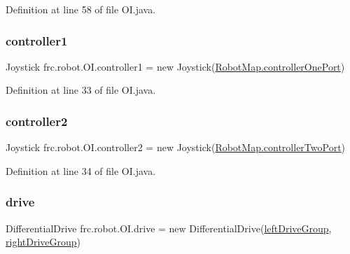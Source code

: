 Definition at line 58 of file O\+I.\+java.

\mbox{\label{classfrc_1_1robot_1_1_o_i_a06db411c1eebb80d10f685c57954bac9}} 
\subsubsection{\texorpdfstring{controller1}{controller1}}
{\footnotesize\ttfamily Joystick frc.\+robot.\+O\+I.\+controller1 = new Joystick(\hyperlink{classfrc_1_1robot_1_1_robot_map_adf0118e5a9de03d6f71ea1e5a6a81cc9}{Robot\+Map.\+controller\+One\+Port})\hspace{0.3cm}{\ttfamily [static]}}



Definition at line 33 of file O\+I.\+java.

\mbox{\label{classfrc_1_1robot_1_1_o_i_a749a3f830f90057dc4fd65e7f34a3251}} 
\subsubsection{\texorpdfstring{controller2}{controller2}}
{\footnotesize\ttfamily Joystick frc.\+robot.\+O\+I.\+controller2 = new Joystick(\hyperlink{classfrc_1_1robot_1_1_robot_map_a762ebcaa07378c37d88654506850e07f}{Robot\+Map.\+controller\+Two\+Port})\hspace{0.3cm}{\ttfamily [static]}}



Definition at line 34 of file O\+I.\+java.

\mbox{\label{classfrc_1_1robot_1_1_o_i_a8527ec31aa37a3ff523e5ba857aba46f}} 
\subsubsection{\texorpdfstring{drive}{drive}}
{\footnotesize\ttfamily Differential\+Drive frc.\+robot.\+O\+I.\+drive = new Differential\+Drive(\hyperlink{classfrc_1_1robot_1_1_o_i_a6d76241e542ab271366e4cb4bf7b5133}{left\+Drive\+Group}, \hyperlink{classfrc_1_1robot_1_1_o_i_a1595c2b8ebd7e4e467027b2eb21983ee}{right\+Drive\+Group})\hspace{0.3cm}{\ttfamily [static]}}



